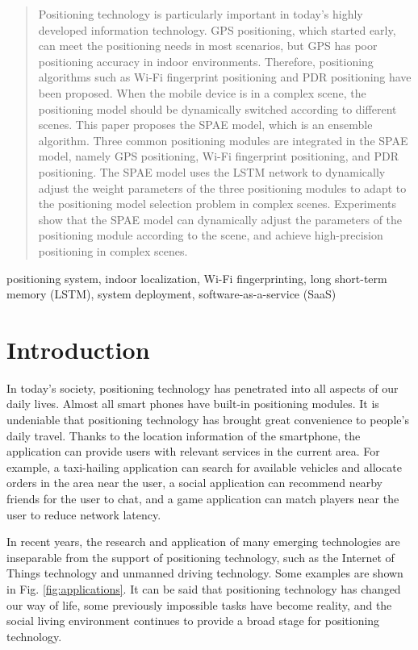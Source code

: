 \documentclass[conference]{IEEEtran}
\begin{document}
\begin{abstract}
Positioning technology is particularly important in today's highly developed information technology. GPS positioning, which started early, can meet the positioning needs in most scenarios, but GPS has poor positioning accuracy in indoor environments. Therefore, positioning algorithms such as Wi-Fi fingerprint positioning and PDR positioning have been proposed. When the mobile device is in a complex scene, the positioning model should be dynamically switched according to different scenes. This paper proposes the SPAE model, which is an ensemble algorithm. Three common positioning modules are integrated in the SPAE model, namely GPS positioning, Wi-Fi fingerprint positioning, and PDR positioning. The SPAE model uses the LSTM network to dynamically adjust the weight parameters of the three positioning modules to adapt to the positioning model selection problem in complex scenes. Experiments show that the SPAE model can dynamically adjust the parameters of the positioning module according to the scene, and achieve high-precision positioning in complex scenes.
\end{abstract}

\begin{IEEEkeywords}
positioning system, indoor localization, Wi-Fi fingerprinting, long short-term memory (LSTM), system deployment,  software-as-a-service (SaaS)
\end{IEEEkeywords}

\section{Introduction}
In today's society, positioning technology has penetrated into all aspects of our daily lives. Almost all smart phones have built-in positioning modules. It is undeniable that positioning technology has brought great convenience to people's daily travel. Thanks to the location information of the smartphone, the application can provide users with relevant services in the current area. For example, a taxi-hailing application can search for available vehicles and allocate orders in the area near the user, a social application can recommend nearby friends for the user to chat, and a game application can match players near the user to reduce network latency.

In recent years, the research and application of many emerging technologies are inseparable from the support of positioning technology, such as the Internet of Things technology and unmanned driving technology. Some examples are shown in Fig. \ref{fig:applications}. It can be said that positioning technology has changed our way of life, some previously impossible tasks have become reality, and the social living environment continues to provide a broad stage for positioning technology.
\end{document}
